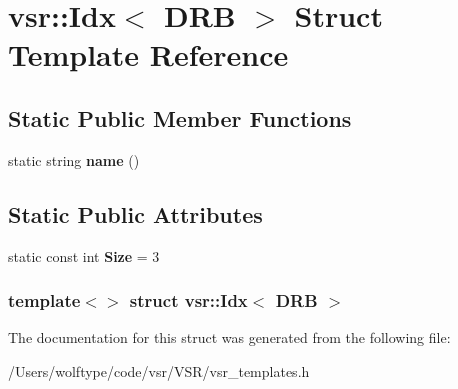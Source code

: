 \hypertarget{structvsr_1_1_idx_3_01_d_r_b_01_4}{\section{vsr\-:\-:Idx$<$ D\-R\-B $>$ Struct Template Reference}
\label{structvsr_1_1_idx_3_01_d_r_b_01_4}
}
\subsection*{Static Public Member Functions}
\begin{DoxyCompactItemize}
\item 
\hypertarget{structvsr_1_1_idx_3_01_d_r_b_01_4_afb80033f5523d0c7daacb5c1a7519747}{static string {\bfseries name} ()}\label{structvsr_1_1_idx_3_01_d_r_b_01_4_afb80033f5523d0c7daacb5c1a7519747}

\end{DoxyCompactItemize}
\subsection*{Static Public Attributes}
\begin{DoxyCompactItemize}
\item 
\hypertarget{structvsr_1_1_idx_3_01_d_r_b_01_4_a1902c698422f93a240334b7a9aed2290}{static const int {\bfseries Size} = 3}\label{structvsr_1_1_idx_3_01_d_r_b_01_4_a1902c698422f93a240334b7a9aed2290}

\end{DoxyCompactItemize}
\subsubsection*{template$<$$>$ struct vsr\-::\-Idx$<$ D\-R\-B $>$}



The documentation for this struct was generated from the following file\-:\begin{DoxyCompactItemize}
\item 
/\-Users/wolftype/code/vsr/\-V\-S\-R/vsr\-\_\-templates.\-h\end{DoxyCompactItemize}
